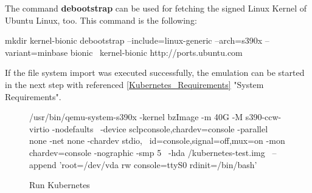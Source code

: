 The command \textbf{debootstrap} can be used for fetching the signed Linux Kernel of Ubuntu Linux, too.
This command is the following: \\
\begin{boxedverbatim}
mkdir kernel-bionic
debootstrap --include=linux-generic --arch=s390x --variant=minbase bionic \
kernel-bionic http://ports.ubuntu.com 
\end{boxedverbatim}

If the file system import was executed successfully, the emulation can be started in the next step with referenced \ref{Kubernetes_Requirements} "System Requirements".

\begin{figure}[H]
\centering
\begin{boxedverbatim}
 /usr/bin/qemu-system-s390x -kernel bzImage -m 40G -M s390-ccw-virtio -nodefaults \
 -device sclpconsole,chardev=console -parallel none -net none -chardev stdio, \
 id=console,signal=off,mux=on -mon chardev=console -nographic -smp 5 \
 -hda /kubernetes-test.img \
 --append 'root=/dev/vda rw console=ttyS0 rdinit=/bin/bash' 
\end{boxedverbatim}
 \caption{Run Kubernetes}
    \label{RunKubernetes}
\end{figure}

